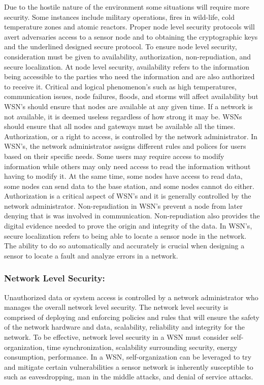 Due to the hostile nature of the environment some situations will require more security. Some instances include military operations, fires in wild-life, cold temperature zones and atomic reactors. Proper node level security protocols will avert adversaries access to a sensor node and to obtaining the cryptographic keys and the underlined designed secure protocol. To ensure node level security, consideration must be given to availability, authorization, non-repudiation, and secure localization. At node level security, availability refers to the information being accessible to the parties who need the information and are also authorized to receive it. Critical and logical phenomenon’s such as high temperatures, communication issues, node failures, floods, and storms will affect availability but WSN’s should ensure that nodes are available at any given time. If a network is not available, it is deemed useless regardless of how strong it may be. WSNs should ensure that all nodes and gateways must be available all the times. Authorization, or a right to access, is controlled by the network administrator. In WSN’s, the network administrator assigns different rules and polices for users based on their specific needs. Some users may require access to modify information while others may only need access to read the information without having to modify it. At the same time, some nodes have access to read data, some nodes can send data to the base station, and some nodes cannot do either. Authorization is a critical aspect of WSN’s and it is generally controlled by the network administrator. Non-repudiation in WSN’s prevent a node from later denying that is was involved in communication. Non-repudiation also provides the digital evidence needed to prove the origin and integrity of the data. In WSN’s, secure localization refers to being able to locate a sensor node in the network. The ability to do so automatically and accurately is crucial when designing a sensor to locate a fault and analyze errors in a network. 

\subsubsection {Network Level Security:}

Unauthorized data or system access is controlled by a network administrator who manages the overall network level security. The network level security is comprised of deploying and enforcing policies and rules that will ensure the safety of the network hardware and data, scalability, reliability and integrity for the network. To be effective, network level security in a WSN must consider self-organization, time synchronization, scalability surrounding security, energy consumption, performance. In a WSN, self-organization can be leveraged to try and mitigate certain vulnerabilities a sensor network is inherently susceptible to such as eavesdropping, man in the middle attacks, and denial of service attacks.

